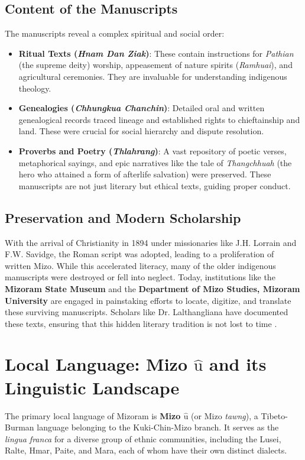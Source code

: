 \documentclass[12pt]{article}
\begin{document}
\subsection{Content of the Manuscripts}
The manuscripts reveal a complex spiritual and social order:
\begin{itemize}
    \item \textbf{Ritual Texts (\textit{Hnam Dan Ziak})}: These contain instructions for \textit{Pathian} (the supreme deity) worship, appeasement of nature spirits (\textit{Ramhuai}), and agricultural ceremonies. They are invaluable for understanding indigenous theology.
    \item \textbf{Genealogies (\textit{Chhungkua Chanchin})}: Detailed oral and written genealogical records traced lineage and established rights to chieftainship and land. These were crucial for social hierarchy and dispute resolution.
    \item \textbf{Proverbs and Poetry (\textit{Thlahrang})}: A vast repository of poetic verses, metaphorical sayings, and epic narratives like the tale of \textit{Thangchhuah} (the hero who attained a form of afterlife salvation) were preserved. These manuscripts are not just literary but ethical texts, guiding proper conduct.
\end{itemize}

\subsection{Preservation and Modern Scholarship}
With the arrival of Christianity in 1894 under missionaries like J.H. Lorrain and F.W. Savidge, the Roman script was adopted, leading to a proliferation of written Mizo. While this accelerated literacy, many of the older indigenous manuscripts were destroyed or fell into neglect. Today, institutions like the \textbf{Mizoram State Museum} and the \textbf{Department of Mizo Studies, Mizoram University} are engaged in painstaking efforts to locate, digitize, and translate these surviving manuscripts. Scholars like Dr. Lalthangliana have documented these texts, ensuring that this hidden literary tradition is not lost to time \cite{lalthangliana2015mizo}.

\newpage

\section{Local Language: Mizo $\hat{\text{u}}$ and its Linguistic Landscape}
The primary local language of Mizoram is \textbf{Mizo $\hat{\text{u}}$} (or Mizo \textit{tawng}), a Tibeto-Burman language belonging to the Kuki-Chin-Mizo branch. It serves as the \textit{lingua franca} for a diverse group of ethnic communities, including the Lusei, Ralte, Hmar, Paite, and Mara, each of whom have their own distinct dialects.
\end{document}
